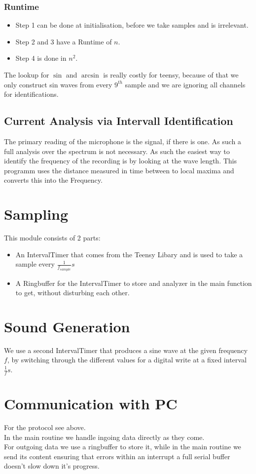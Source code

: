 \documentclass{book}
\begin{document}
\subsubsection{Runtime}
\begin{itemize}
\item Step 1 can be done at initialisation, before we take samples and is irrelevant.
\item Step 2 and 3 have a Runtime of $n$.
\item Step 4 is done in $n^2$.
\end{itemize}
The lookup for $\sin$ and $\arcsin$ is really costly for teensy, because of that we only construct sin waves from every $9^{th}$ sample and we are ignoring all channels for identifications.

\subsection{Current Analysis via Intervall Identification}
The primary reading of the microphone is the signal, if there is one. As such a full analysis over the spectrum is not necessary. As such the easiest way to identify the frequency of the recording is by looking at the wave length. This programm uses the distance measured in time between to local maxima and converts this into the Frequency.

\section{Sampling}
This module consists of 2 parts:
\begin{itemize}
\item An IntervalTimer that comes from the Teensy Libary and is used to take a sample every $\frac{1}{f_{sample}}s$
\item A Ringbuffer for the IntervalTimer to store and analyzer in the main function to get, without disturbing each other.
\end{itemize}

\section{Sound Generation}
We use a second IntervalTimer that produces a sine wave at the given frequency $f$, by switching through the different values for a digital write at a fixed interval $\frac{1}{f}s$.

\section{Communication with PC}
For the protocol see above.
\\In the main routine we handle ingoing data directly as they come.
\\For outgoing data we use a ringbuffer to store it, while in the main routine we send its content ensuring that errors within an interrupt a full serial buffer doesn't slow down it's progress.
\end{document}
